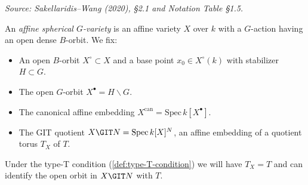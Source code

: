 \begin{definition}
  \label{def:spherical-variety}
  \textit{Source: Sakellaridis--Wang (2020), §2.1 and Notation Table §1.5.}

  An \emph{affine spherical \( G \)-variety} is an affine variety \( X \) over \( k \)
  with a \( G \)-action having an open dense \( B \)-orbit.  We fix:
  \begin{itemize}
    \item An open \( B \)-orbit \( X^\circ \subset X \) and a base point
          \( x_0 \in X^\circ(k) \) with stabilizer \( H \subset G \).
    \item The open \( G \)-orbit \( X^\bullet = H \backslash G \).
    \item The canonical affine embedding \( X^{\mathrm{can}} = \mathrm{Spec}\, k[X^\bullet] \).
    \item The GIT quotient \( X \GIT N = \mathrm{Spec}\, k[X]^N \),
          an affine embedding of a quotient torus \( T_X \) of \( T \).
  \end{itemize}
  Under the type-T condition (\cref{def:type-T-condition}) we will have \( T_X = T \) and
  can identify the open orbit in \( X \GIT N \) with \( T \).
\end{definition}

